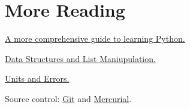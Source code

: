 \documentclass[justified, nobib]{tufte-handout}
\newcommand{\listTutorialLink}
  {https://docs.python.org/2/tutorial/datastructures.html}
\newcommand{\pintLink}{http://pint.readthedocs.org/en/0.6/}
\newcommand{\hgLink}{http://mercurial.selenic.com/}
\newcommand{\gitLink}{http://git-scm.com/}
\newcommand{\lambdaTutorialLink}
  {https://pythonconquerstheuniverse.wordpress.com/2011/08/29/lambda_tutorial/}
\newcommand{\functionalProgrammingLink}
  {http://www.ibm.com/developerworks/library/l-prog/}
\begin{document}



\pagebreak

\section*{More Reading}
\begin{description}
\item \href{http://learnpythonthehardway.org/book/}{A more comprehensive guide to learning Python.}

\item \href{\listTutorialLink}{Data Structures and List Maniupulation.}

\item \href{\pintLink}{Units and Errors.}

\item Source control: \href{\gitLink}{Git} and \href{\hgLink}{Mercurial}.


\end{description}
\end{document}
